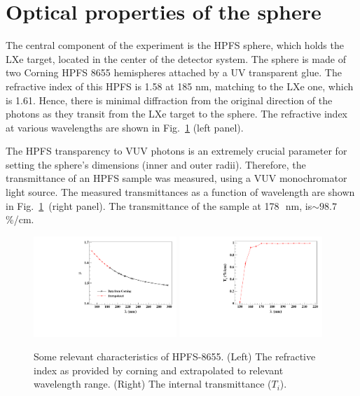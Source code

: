 \section{Optical properties of the sphere }
\label{sec:opt}


The central component of the experiment is the HPFS sphere, which holds the LXe target, located in the center of the detector system. The sphere is made of two Corning HPFS 8655 hemispheres attached by a UV transparent glue. The refractive index of this HPFS is 1.58 at 185 nm, matching to the LXe one, which is 1.61. Hence, there is minimal diffraction from the original direction of the photons as they transit from the LXe target to the sphere. The refractive index at various wavelengths are shown in Fig.~\ref{fig:hpfsRIcalibration} (left panel).


The HPFS transparency to VUV photons is an extremely crucial parameter for setting the sphere's dimensions (inner and outer radii). 
Therefore, the transmittance of an HPFS sample was measured, using a VUV monochromator light source. The measured transmittances as a function of wavelength are shown in Fig.~\ref{fig:hpfsRIcalibration}~(right panel). The transmittance of the sample at 178~\,nm, is$\sim98.7$\,\%/cm.  

\begin{figure}[h]
   \centering
   \includegraphics[width=0.48\textwidth]{RI-calibration.pdf}
    \includegraphics[width=0.48\textwidth]{IntTransmittance.pdf}
   \caption{Some relevant characteristics of HPFS-8655. (Left) The refractive index as provided by corning and 
   extrapolated to relevant wavelength range. (Right) The internal transmittance ($T_{i}$). } 
   \label{fig:hpfsRIcalibration}
\end{figure}

